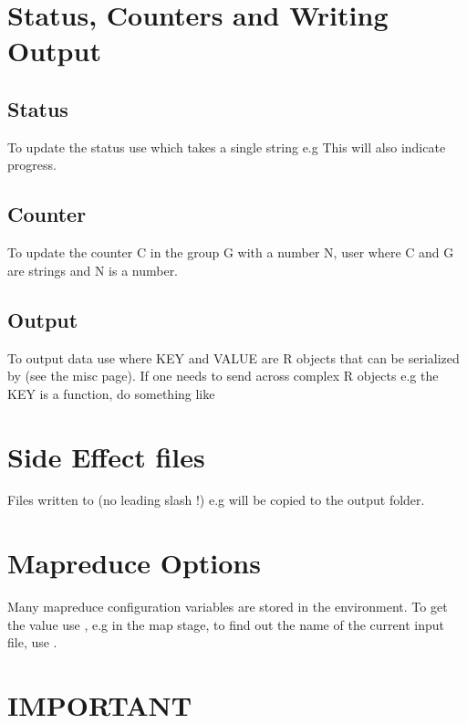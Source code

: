 \documentclass[letterpaper,10pt,english]{manual}
\begin{document}
\section{Status, Counters and Writing Output}


\subsection{Status}

To update the status use  which takes a single string e.g 
This will also indicate progress.


\subsection{Counter}

To update the counter C in the group G with a number N, user 
where C and G are strings and N is a number.


\subsection{Output}

To output data use  where KEY and VALUE are R objects that can be serialized by  (see the misc page). If one needs to send across complex R objects e.g the KEY is a function, do something like 


\section{Side Effect files}

Files written to  (no leading slash !) e.g  will be copied to the output folder.


\section{Mapreduce Options}

Many mapreduce configuration variables are stored in the environment. To get the value use , e.g in the map stage, to find out the name of the current input file, use  .


\section{IMPORTANT}
\end{document}
